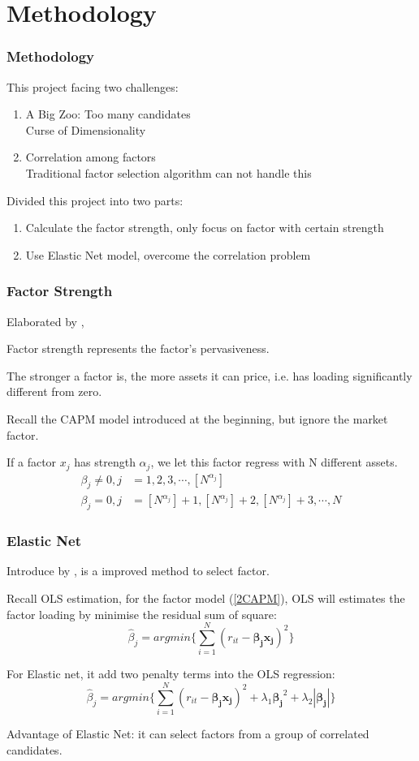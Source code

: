 \documentclass[12pt]{beamer}
\begin{document}
	\section{Methodology}

\begin{frame}
\frametitle{Methodology}
This project facing two challenges:
\begin{enumerate}
\item	 A Big Zoo:  Too many candidates\\
Curse of Dimensionality 
\item 	Correlation among factors \\
Traditional factor selection algorithm can not handle this
\end{enumerate}\pause
Divided this project into two parts:
\begin{enumerate}
\item Calculate the factor strength, only focus on factor with certain strength
\item Use Elastic Net model, overcome the correlation problem 
\end{enumerate}
\end{frame}
	
\begin{frame}
\frametitle{Factor Strength}
Elaborated by  , 

Factor strength represents the factor's pervasiveness.

The stronger a factor is, the more assets it can price, i.e. has loading significantly \alert{different from zero.}

Recall the CAPM model introduced at the beginning, but ignore the market factor.

If a factor $x_j$ has strength $\alpha_j$, we let this factor regress with N different assets.
\begin{align*}
\beta_j \neq 0, j &= 1, 2, 3, \cdots, [N^{\alpha_j}]\\
\beta_j = 0, j &= [N^{\alpha_j} ]+1 ,[N^{\alpha_j}]  +2, [N^{\alpha_j}] +3, \cdots, N
\end{align*}
\end{frame}

\begin{frame}
\frametitle{Elastic Net}
Introduce by , is a improved method to select factor.

Recall OLS estimation, for the factor model (\ref{2CAPM}), OLS will estimates the factor loading by minimise the residual sum of square:
\[  \hat{\beta}_j  = argmin\{\sum_{i = 1}^{N}(r_{it} - \mathbf{\beta_j }\mathbf{x_j})^2\} \]

For Elastic net, it add two penalty terms into the OLS regression:
	\[   \hat{\beta}_j  = argmin\{\sum_{i = 1}^{N}(r_{it} - \mathbf{\beta_j }\mathbf{x_j})^2 + \lambda_1\mathbf{\beta_j}^2  + \lambda_2|\mathbf{\beta_j}|  \label{ENcriterion} \tag{2}   \}    \]
	
	Advantage of Elastic Net: it can select factors from a group of correlated candidates.
\end{frame}
\end{document}
